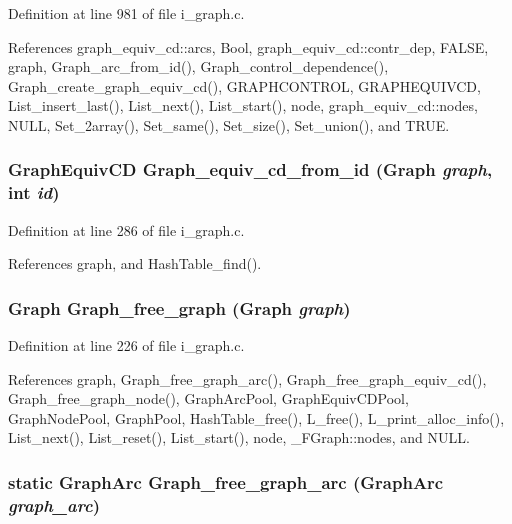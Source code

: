 Definition at line 981 of file i\_\-graph.c.

References graph\_\-equiv\_\-cd::arcs, Bool, graph\_\-equiv\_\-cd::contr\_\-dep, FALSE, graph, Graph\_\-arc\_\-from\_\-id(), Graph\_\-control\_\-dependence(), Graph\_\-create\_\-graph\_\-equiv\_\-cd(), GRAPHCONTROL, GRAPHEQUIVCD, List\_\-insert\_\-last(), List\_\-next(), List\_\-start(), node, graph\_\-equiv\_\-cd::nodes, NULL, Set\_\-2array(), Set\_\-same(), Set\_\-size(), Set\_\-union(), and TRUE.
\subsubsection{\setlength{\rightskip}{0pt plus 5cm}\bf{Graph\-Equiv\-CD} Graph\_\-equiv\_\-cd\_\-from\_\-id (\bf{Graph} {\em graph}, int {\em id})}\label{i__graph_8c_5751d9f08022b1979b8bf187f0095313}




Definition at line 286 of file i\_\-graph.c.

References graph, and Hash\-Table\_\-find().
\subsubsection{\setlength{\rightskip}{0pt plus 5cm}\bf{Graph} Graph\_\-free\_\-graph (\bf{Graph} {\em graph})}\label{i__graph_8c_535bfb62fad6a432f61745f6e7ce591b}




Definition at line 226 of file i\_\-graph.c.

References graph, Graph\_\-free\_\-graph\_\-arc(), Graph\_\-free\_\-graph\_\-equiv\_\-cd(), Graph\_\-free\_\-graph\_\-node(), Graph\-Arc\-Pool, Graph\-Equiv\-CDPool, Graph\-Node\-Pool, Graph\-Pool, Hash\-Table\_\-free(), L\_\-free(), L\_\-print\_\-alloc\_\-info(), List\_\-next(), List\_\-reset(), List\_\-start(), node, \_\-FGraph::nodes, and NULL.
\subsubsection{\setlength{\rightskip}{0pt plus 5cm}static \bf{Graph\-Arc} Graph\_\-free\_\-graph\_\-arc (\bf{Graph\-Arc} {\em graph\_\-arc})\hspace{0.3cm}{\tt  [static]}}\label{i__graph_8c_c776ce584faa3fee0a257dee27ff24c0}




